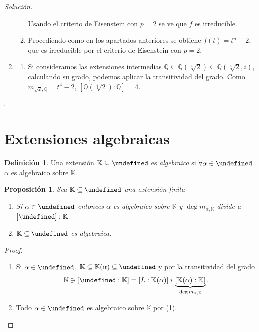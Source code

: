 \documentclass[10pt, spanish]{report}
\newtheorem{prop}[tma]{Proposición}
\theoremstyle{definition}
\newtheorem*{defin}{Definición}
\newenvironment{sol}{\textit{Solución.}}{\hfill$\square$}
\newcommand{\N}{\mathbb{N}}
\newcommand{\Q}{\mathbb{Q}}
\newcommand{\K}{\mathbb{K}}
\let\L\undefined
\newcommand{\L}{\mathbb{L}}
\newcommand{\fecha}[1]{\marginpar{\underline{\footnotesize{#1}}}}
\begin{document}
\begin{sol}
\begin{enumerate}
\begin{enumerate}
                     Usando el criterio de Eisenstein con $p=2$ se ve que $f$ es
                     irreducible.
                \item Procediendo como en los apartados anteriores se obtiene
                    $f(t)=t^n-2$, que es irreducible por el criterio de
                    Eisenstein con $p=2$.
            \end{enumerate}
        \item
            \begin{enumerate}
                \item Si consideramos las extensiones intermedias
                    $\Q\subseteq\Q(\sqrt[4]{2})\subseteq\Q(\sqrt[4]{2},i)$,
                    calculando su grado, podemos aplicar la transitividad del
                    grado. Como $m_{\sqrt{2},\Q}=t^4-2$,
                    $[\Q(\sqrt[4]{2}):\Q]=4$.
            \end{enumerate}
    \end{enumerate}\vspace{-1.75em}
\end{sol}
\fecha{1/03}
\section{Extensiones algebraicas}
\begin{defin}
    Una extensión $\K\subseteq\L$ es \textit{algebraica} si
    $\forall\alpha\in\L$ $\alpha$ es algebraico sobre $\K$.
\end{defin}

\begin{prop}
    Sea $\K\subseteq\L$ una extensión finita
    \begin{enumerate}
        \item Si $\alpha\in \L$ entonces $\alpha$ es algebraico sobre $\K$ y
            $\deg{m_{\alpha,\K}}$ divide a $[\L]:\K$.
        \item $\K\subseteq\L$ es algebraica.
    \end{enumerate}
\end{prop}

\begin{proof}\hspace{0pt}
    \begin{enumerate}
        \item Si $\alpha\in\L$,  $\K\subseteq\K(\alpha)\subseteq\L$  y por la
            transitividad del grado
            \[\N\ni[\L:\K]=[L:\K(\alpha)]*\underbrace{[\K(\alpha):\K]}_{\deg{m_{\alpha,\K}}}.\]
        \item Todo $\alpha\in\L$ es algebraico sobre $\K$ por (1).
    \end{enumerate}\vspace{-1.75em}
\end{proof}
\end{document}
